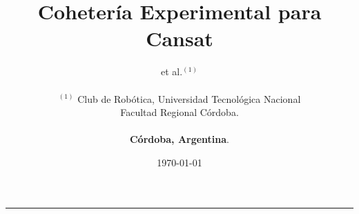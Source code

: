 \documentclass[a4paper]{article} %
\date{\today}
\begin{document}
\title{\textbf{Cohetería Experimental para Cansat}}

\author{et al.$^{(1)}$ \\\\
       $^{(1)}$ Club de Rob\'{o}tica, Universidad Tecnol\'{o}gica Nacional \\Facultad Regional C\'{o}rdoba. \\\\ \textbf{C\'{o}rdoba, Argentina}.\\ 
       }

\maketitle

\thispagestyle{empty}
\begin{center}\rule{0.9\textwidth}{0.1mm} \end{center} 

\end{document}
